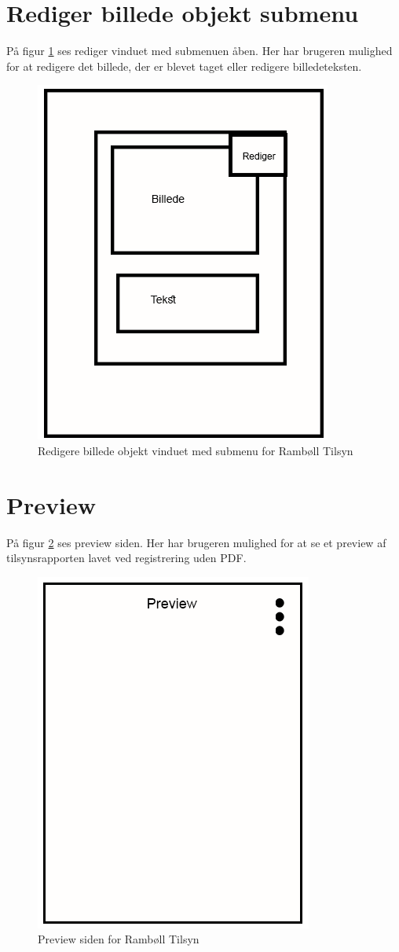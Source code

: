 \section{Rediger billede objekt submenu}\label{sec:RedigerBilledeSubMock}
På figur \ref{fig:RedigerBilledeSubMock} ses rediger vinduet med submenuen åben. Her har brugeren mulighed for at redigere det billede, der er blevet taget eller redigere billedeteksten.

\begin{figure}[H]
	\centering
	\includegraphics[width=0.4\linewidth]{MockUps/Mock/Ramboell-RedigerBilledeOpbjekt-Sub}
	\caption{Redigere billede objekt vinduet med submenu for Rambøll Tilsyn}
	\label{fig:RedigerBilledeSubMock}
\end{figure}

\clearpage

\section{Preview}\label{sec:PreviewMock}
På figur \ref{fig:PreviewMock} ses preview siden. Her har brugeren mulighed for at se et preview af tilsynsrapporten lavet ved registrering uden PDF.

\begin{figure}[H]
	\centering
	\includegraphics[width=0.4\linewidth]{MockUps/Mock/Ramboell-Preview}
	\caption{Preview siden for Rambøll Tilsyn}
	\label{fig:PreviewMock}
\end{figure}

